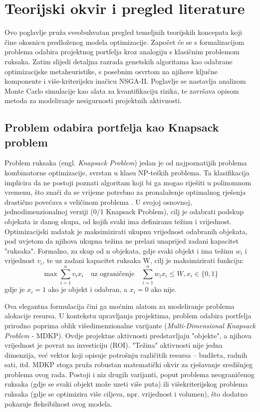 \section{Teorijski okvir i pregled literature}
\label{chap:teorija}

Ovo poglavlje pruža sveobuhvatan pregled temeljnih teorijskih koncepata koji čine okosnicu predloženog modela optimizacije. Započet će se s formalizacijom problema odabira projektnog portfelja kroz analogiju s klasičnim problemom ruksaka. Zatim slijedi detaljna razrada genetskih algoritama kao odabrane optimizacijske metaheuristike, s posebnim osvrtom na njihove ključne komponente i više-kriterijsku inačicu NSGA-II. Poglavlje se nastavlja analizom Monte Carlo simulacije kao alata za kvantifikaciju rizika, te završava opisom metoda za modeliranje nesigurnosti projektnih aktivnosti.
\subsection{Problem odabira portfelja kao Knapsack problem}

Problem ruksaka (engl. \textit{Knapsack Problem}) jedan je od najpoznatijih problema kombinatorne optimizacije, svrstan u klasu NP-teških problema. Ta klasifikacija implicira da ne postoji poznati algoritam koji bi ga mogao riješiti u polinomnom vremenu, što znači da se vrijeme potrebno za pronalaženje optimalnog rješenja drastično povećava s veličinom problema \cite{GareyJohnson1979, Kellerer2004}. U svojoj osnovnoj, jednodimenzionalnoj verziji (0/1 Knapsack Problem), cilj je odabrati podskup objekata iz danog skupa, od kojih svaki ima definiranu težinu i vrijednost. Optimizacijski zadatak je maksimizirati ukupnu vrijednost odabranih objekata, pod uvjetom da njihova ukupna težina ne prelazi unaprijed zadani kapacitet "ruksaka". Formalno, za skup od n objekata, gdje svaki objekt i ima težinu $w_i$ i vrijednost $v_i$, te uz zadani kapacitet ruksaka W, cilj je maksimizirati funkciju:
$$
\max \sum_{i=1}^n v_i x_i \quad \text{uz ograničenje} \quad \sum_{i=1}^n w_i x_i \leq W, x_i \in \{0,1\}
$$
gdje je $x_i=1$ ako je objekt i odabran, a $x_i=0$ ako nije.

Ova elegantna formulacija čini ga moćnim alatom za modeliranje problema alokacije resursa. U kontekstu upravljanja projektima, problem odabira portfelja prirodno poprima oblik višedimenzionalne varijante (\textit{Multi-Dimensional Knapsack Problem} - MDKP). Ovdje projektne aktivnosti predstavljaju "objekte", a njihova vrijednost je povrat na investiciju (ROI). "Težina" aktivnosti nije jedna dimenzija, već vektor koji opisuje potrošnju različitih resursa – budžeta, radnih sati, itd. MDKP stoga pruža robustan matematički okvir za rješavanje središnjeg problema ovog rada. Postoji i niz drugih varijanti, poput problema neograničenog ruksaka (gdje se svaki objekt može uzeti više puta) ili višekriterijskog problema ruksaka (gdje se optimizira više ciljeva, npr. vrijednost i volumen), što dodatno pokazuje fleksibilnost ovog modela.

